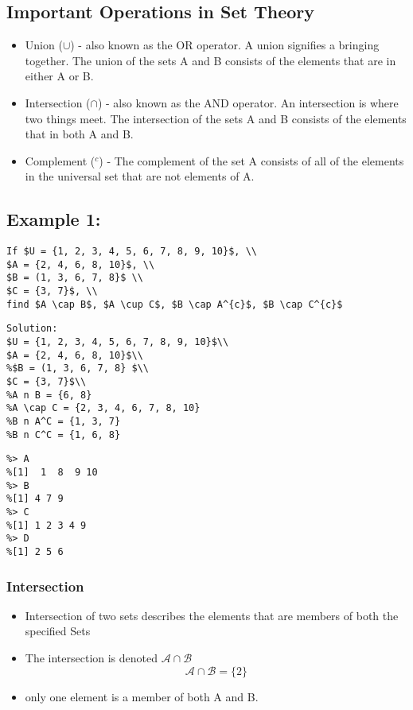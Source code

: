 \documentclass[12pt]{article}
\begin{document}
\subsection{Important Operations in Set Theory}
\begin{itemize}
\item Union ($\cup$) - also known as the OR operator. A union signifies a bringing together. The union of the sets A and B consists of the elements that are in either A or B.
\item Intersection ($\cap$) - also known as the AND operator. An intersection is where two things meet. The intersection of the sets A and B consists of the elements that in both A and B.
\item Complement ($^{c}$) - The complement of the set A consists of all of the elements in the universal set that are not elements of A.
\end{itemize}
\subsection*{Example 1: }
\begin{verbatim}
If $U = {1, 2, 3, 4, 5, 6, 7, 8, 9, 10}$, \\
$A = {2, 4, 6, 8, 10}$, \\
$B = (1, 3, 6, 7, 8}$ \\
$C = {3, 7}$, \\
find $A \cap B$, $A \cup C$, $B \cap A^{c}$, $B \cap C^{c}$
\end{verbatim}
\begin{verbatim}
Solution:
$U = {1, 2, 3, 4, 5, 6, 7, 8, 9, 10}$\\
$A = {2, 4, 6, 8, 10}$\\
%$B = (1, 3, 6, 7, 8} $\\
$C = {3, 7}$\\
%A n B = {6, 8}
%A \cap C = {2, 3, 4, 6, 7, 8, 10}
%B n A^C = {1, 3, 7}
%B n C^C = {1, 6, 8}
\end{verbatim}
\begin{verbatim}
%> A
%[1]  1  8  9 10
%> B
%[1] 4 7 9
%> C
%[1] 1 2 3 4 9
%> D
%[1] 2 5 6
\end{verbatim}

\subsubsection*{Intersection}
\begin{itemize}
\item Intersection of two sets describes the elements that are members of both the specified Sets
\item The intersection is denoted $\mathcal{A\cap B}$
\[ \mathcal{A\cap B} = \{2\}\]
\item only one element is a member of both A and B.
\end{itemize}
\end{document}
